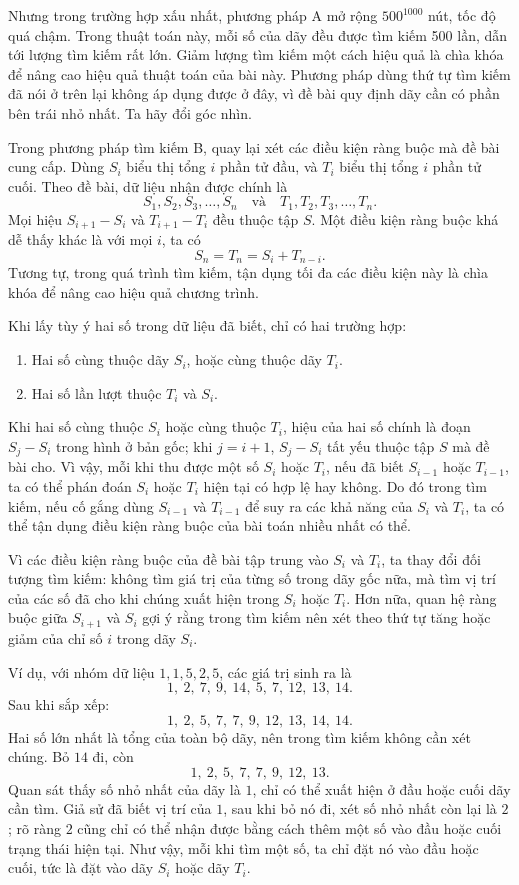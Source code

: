 \documentclass[11pt]{article}
\begin{document}
Nhưng trong trường hợp xấu nhất, phương pháp A mở rộng \(500^{1000}\) nút,
tốc độ quá chậm. Trong thuật toán này, mỗi số của dãy đều được tìm kiếm 500
lần, dẫn tới lượng tìm kiếm rất lớn. Giảm lượng tìm kiếm một cách hiệu quả là
chìa khóa để nâng cao hiệu quả thuật toán của bài này. Phương pháp dùng thứ
tự tìm kiếm đã nói ở trên lại không áp dụng được ở đây, vì đề bài quy định dãy
cần có phần bên trái nhỏ nhất. Ta hãy đổi góc nhìn.

Trong phương pháp tìm kiếm B, quay lại xét các điều kiện ràng buộc mà đề bài
cung cấp. Dùng \(S_i\) biểu thị tổng \(i\) phần tử đầu, và \(T_i\) biểu thị
tổng \(i\) phần tử cuối. Theo đề bài, dữ liệu nhận được chính là
\[
  S_1,S_2,S_3,\ldots,S_n
  \quad\text{và}\quad
  T_1,T_2,T_3,\ldots,T_n.
\]
Mọi hiệu \(S_{i+1}-S_i\) và \(T_{i+1}-T_i\) đều thuộc tập \(S\). Một điều kiện
ràng buộc khá dễ thấy khác là với mọi \(i\), ta có
\[
  S_n=T_n=S_i+T_{n-i}.
\]
Tương tự, trong quá trình tìm kiếm, tận dụng tối đa các điều kiện này là chìa
khóa để nâng cao hiệu quả chương trình.

Khi lấy tùy ý hai số trong dữ liệu đã biết, chỉ có hai trường hợp:
\begin{enumerate}
  \item Hai số cùng thuộc dãy \(S_i\), hoặc cùng thuộc dãy \(T_i\).
  \item Hai số lần lượt thuộc \(T_i\) và \(S_i\).
\end{enumerate}

Khi hai số cùng thuộc \(S_i\) hoặc cùng thuộc \(T_i\), hiệu của hai số chính
là đoạn \(S_j-S_i\) trong hình ở bản gốc; khi \(j=i+1\), \(S_j-S_i\) tất yếu
thuộc tập \(S\) mà đề bài cho. Vì vậy, mỗi khi thu được một số \(S_i\) hoặc
\(T_i\), nếu đã biết \(S_{i-1}\) hoặc \(T_{i-1}\), ta có thể phán đoán
\(S_i\) hoặc \(T_i\) hiện tại có hợp lệ hay không. Do đó trong tìm kiếm, nếu
cố gắng dùng \(S_{i-1}\) và \(T_{i-1}\) để suy ra các khả năng của \(S_i\) và
\(T_i\), ta có thể tận dụng điều kiện ràng buộc của bài toán nhiều nhất có
thể.

Vì các điều kiện ràng buộc của đề bài tập trung vào \(S_i\) và \(T_i\), ta
thay đổi đối tượng tìm kiếm: không tìm giá trị của từng số trong dãy gốc nữa,
mà tìm vị trí của các số đã cho khi chúng xuất hiện trong \(S_i\) hoặc \(T_i\).
Hơn nữa, quan hệ ràng buộc giữa \(S_{i+1}\) và \(S_i\) gợi ý rằng trong tìm
kiếm nên xét theo thứ tự tăng hoặc giảm của chỉ số \(i\) trong dãy \(S_i\).

Ví dụ, với nhóm dữ liệu \(1,1,5,2,5\), các giá trị sinh ra là
\[
  1,\ 2,\ 7,\ 9,\ 14,\ 5,\ 7,\ 12,\ 13,\ 14.
\]
Sau khi sắp xếp:
\[
  1,\ 2,\ 5,\ 7,\ 7,\ 9,\ 12,\ 13,\ 14,\ 14.
\]
Hai số lớn nhất là tổng của toàn bộ dãy, nên trong tìm kiếm không cần xét
chúng. Bỏ \(14\) đi, còn
\[
  1,\ 2,\ 5,\ 7,\ 7,\ 9,\ 12,\ 13.
\]
Quan sát thấy số nhỏ nhất của dãy là \(1\), chỉ có thể xuất hiện ở đầu hoặc
cuối dãy cần tìm. Giả sử đã biết vị trí của \(1\), sau khi bỏ nó đi, xét số
nhỏ nhất còn lại là \(2\); rõ ràng \(2\) cũng chỉ có thể nhận được bằng cách
thêm một số vào đầu hoặc cuối trạng thái hiện tại. Như vậy, mỗi khi tìm một
số, ta chỉ đặt nó vào đầu hoặc cuối, tức là đặt vào dãy \(S_i\) hoặc dãy
\(T_i\).
\end{document}
